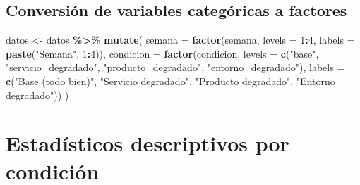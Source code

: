 \documentclass[
  spanish,
]{article}
\newenvironment{Shaded}{\begin{snugshade}}{\end{snugshade}}
\newcommand{\AttributeTok}[1]{\textcolor[rgb]{0.13,0.29,0.53}{#1}}
\newcommand{\DecValTok}[1]{\textcolor[rgb]{0.00,0.00,0.81}{#1}}
\newcommand{\FunctionTok}[1]{\textcolor[rgb]{0.13,0.29,0.53}{\textbf{#1}}}
\newcommand{\NormalTok}[1]{#1}
\newcommand{\OtherTok}[1]{\textcolor[rgb]{0.56,0.35,0.01}{#1}}
\newcommand{\SpecialCharTok}[1]{\textcolor[rgb]{0.81,0.36,0.00}{\textbf{#1}}}
\newcommand{\StringTok}[1]{\textcolor[rgb]{0.31,0.60,0.02}{#1}}
\begin{document}
\subsection{Conversión de variables categóricas a
factores}\label{conversiuxf3n-de-variables-categuxf3ricas-a-factores}

\begin{Shaded}
\begin{Highlighting}[]
\NormalTok{datos }\OtherTok{\textless{}{-}}\NormalTok{ datos }\SpecialCharTok{\%\textgreater{}\%}
  \FunctionTok{mutate}\NormalTok{(}
    \AttributeTok{semana    =} \FunctionTok{factor}\NormalTok{(semana, }\AttributeTok{levels =} \DecValTok{1}\SpecialCharTok{:}\DecValTok{4}\NormalTok{,}
                       \AttributeTok{labels =} \FunctionTok{paste}\NormalTok{(}\StringTok{"Semana"}\NormalTok{, }\DecValTok{1}\SpecialCharTok{:}\DecValTok{4}\NormalTok{)),}
    \AttributeTok{condicion =} \FunctionTok{factor}\NormalTok{(condicion,}
                       \AttributeTok{levels =} \FunctionTok{c}\NormalTok{(}\StringTok{"base"}\NormalTok{,}
                                  \StringTok{"servicio\_degradado"}\NormalTok{,}
                                  \StringTok{"producto\_degradado"}\NormalTok{,}
                                  \StringTok{"entorno\_degradado"}\NormalTok{),}
                       \AttributeTok{labels =} \FunctionTok{c}\NormalTok{(}\StringTok{"Base (todo bien)"}\NormalTok{,}
                                  \StringTok{"Servicio degradado"}\NormalTok{,}
                                  \StringTok{"Producto degradado"}\NormalTok{,}
                                  \StringTok{"Entorno degradado"}\NormalTok{))}
\NormalTok{  )}
\end{Highlighting}
\end{Shaded}

\section{Estadísticos descriptivos por
condición}\label{estaduxedsticos-descriptivos-por-condiciuxf3n}
\end{document}
